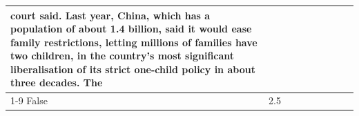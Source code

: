 \begin{table}[H]
\begin{tabular}{lllrlllll}
court said. Last year, China, which has a population of about 1.4 billion, said it would ease family restrictions, letting millions of families have two children, in the country's most significant liberalisation of its strict one-child policy in about three decades. The \\
\cline{1-9}
False & 2.5%
\end{tabular}
\end{table}
